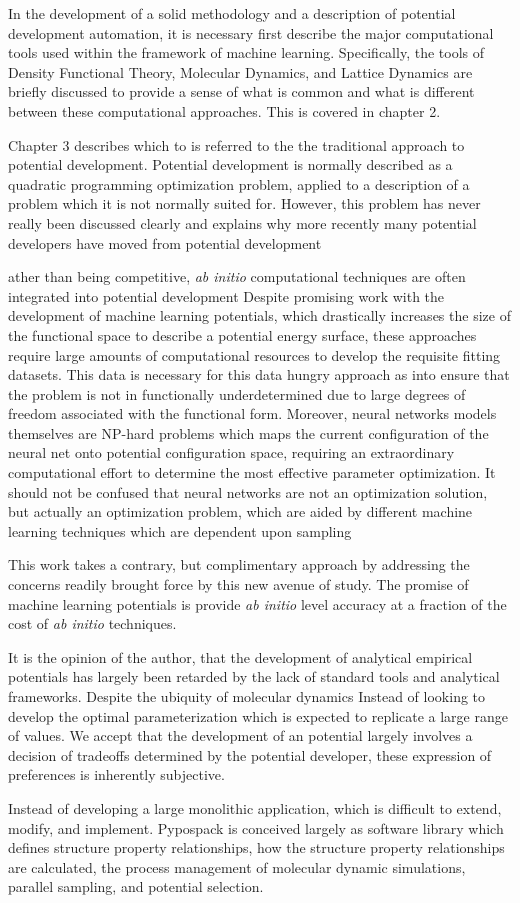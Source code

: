 In the development of a solid methodology and a description of potential development automation, it is necessary first describe the major computational tools used within the framework of machine learning.  Specifically, the tools of Density Functional Theory, Molecular Dynamics, and Lattice Dynamics are briefly discussed to provide a sense of what is common and what is different between these computational approaches.  This is covered in chapter 2.

Chapter 3 describes which to is referred to the the traditional approach to potential development.  Potential development is normally described as a quadratic programming optimization problem, applied to a description of a problem which it is not normally suited for.  However, this problem has never really been discussed clearly and explains why more recently many potential developers have moved from potential development



ather than being competitive, \emph{ab initio} computational techniques are often integrated into potential development
Despite promising work with the development of machine learning potentials, which drastically increases the size of the functional space to describe a potential energy surface, these approaches require large amounts of computational resources to develop the requisite fitting datasets.
This data is necessary for this data hungry approach as into ensure that the problem is not in functionally underdetermined due to large degrees of freedom associated with the functional form.
Moreover, neural networks models themselves are NP-hard problems which maps the current configuration of the neural net onto potential configuration space, requiring an extraordinary computational effort to determine the most effective parameter optimization.
It should not be confused that neural networks are not an optimization solution, but actually an optimization problem, which are aided by different machine learning techniques which are dependent upon sampling

This work takes a contrary, but complimentary approach by addressing the concerns readily brought force by this new avenue of study.
The promise of machine learning potentials is provide \emph{ab initio} level accuracy at a fraction of the cost of \emph{ab initio} techniques.

It is the opinion of the author, that the development of analytical empirical potentials has largely been retarded by the lack of standard tools and analytical frameworks.
Despite the ubiquity of molecular dynamics
Instead of looking to develop the optimal parameterization which is expected to replicate a large range of values.
We accept that the development of an potential largely involves a decision of tradeoffs determined by the potential developer, these expression of preferences is inherently subjective.

Instead of developing a large monolithic application, which is difficult to extend, modify, and implement.  Pypospack is conceived largely as software library which defines structure property relationships, how the structure property relationships are calculated, the process management of molecular dynamic simulations, parallel sampling, and potential selection.
